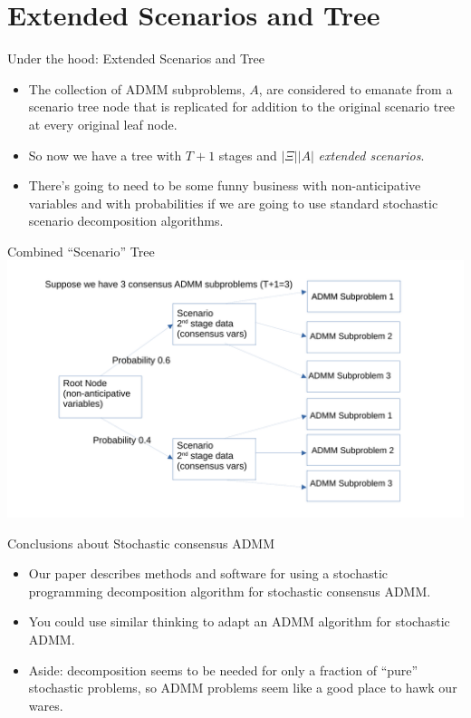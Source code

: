 \documentclass[9pt,usenames,dvipsnames]{beamer}
\begin{document}
\section{Extended Scenarios and Tree}
\begin{frame}{Under the hood: Extended Scenarios and Tree}
  \begin{itemize}
\item The collection of ADMM subproblems, $A$, are considered to emanate from a scenario tree node that is replicated for addition
  to the original scenario tree at every original leaf node.
\item So now we have a tree with $T+1$ stages and $|\Xi| |A|$ {\em extended scenarios}.
\item There's going to need to be some funny business with non-anticipative variables and with probabilities if we are going to use standard stochastic scenario
  decomposition algorithms.
\end{itemize}
\end{frame}

\begin{frame}{Combined ``Scenario'' Tree}
\centering
 \includegraphics[width=1.1\linewidth]{tree2.pdf}
\end{frame}

\begin{frame}{Conclusions about Stochastic consensus ADMM}
\begin{itemize}
\item Our paper describes methods and software for using a stochastic programming decomposition algorithm for stochastic consensus ADMM.
\item You could use similar thinking to adapt an ADMM algorithm for stochastic ADMM.
\item Aside: decomposition seems to be needed for only a fraction of ``pure'' stochastic problems, so ADMM problems seem like a good place to hawk our wares.
\end{itemize}
\end{frame}
\end{document}
